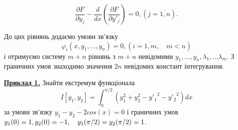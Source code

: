 \documentclass[a4paper]{article}
\begin{document}
	\begin{equation}\label{eq:system_of_Euler_equations}
		\frac{\partial F}{\partial y_j} - \frac{d}{dx} \left(\frac{\partial F}{\partial y'_j}\right) = 0, (j = \overline{1, n}).
	\end{equation}

	До цих рівнянь додаємо умови зв’язку
	\begin{equation}
		\varphi_i(x, y_1, \ldots, y_n) = 0, (i = \overline{1, m}, \quad m < n)
	\end{equation}
	і отримуємо систему $m+n$ рівнянь з $m+n$ невідомими $ y_1, \ldots, y_n, \lambda_1, \ldots \lambda_m $.
	З граничних умов знаходимо значення $2n$ невідомих констант інтегрування.

	\underline{\textbf{Приклад 1.}} Знайти екстремум функціонала
	$$I[y_1, y_2] = \int_{0}^{\pi/2} (y_1^{2} + y_2^{2} - {y'_1}^{2} - {y'_2}^{2})dx$$
	за умови зв’язку $y_1 - y_2 - 2cos(x) = 0$ і граничних умов
	$y_1(0) = 1, \\ y_2(0) = -1,\quad y_1(\pi/2) = y_2(\pi/2) = 1$.
	
\end{document}
